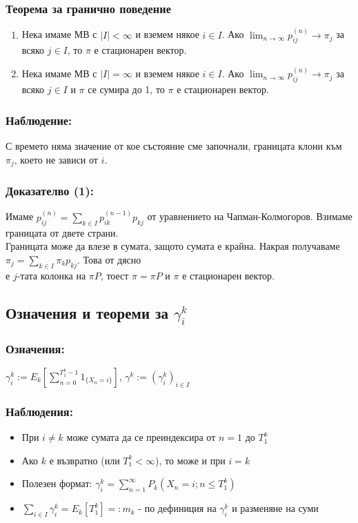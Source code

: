 \documentclass{article}
\begin{document}
\subsubsection*{Теорема за гранично поведение}
\begin{enumerate}
\item Нека имаме МВ с $|I| < \infty$ и вземем някое $i \in I$. Ако $\lim_{n \to \infty} p_{ij}^{(n)} \to \pi_j$ за всяко $j \in I$, то $\pi$ е стационарен вектор.
\item Нека имаме МВ с $|I| = \infty$ и вземем някое $i \in I$. Ако $\lim_{n \to \infty} p_{ij}^{(n)} \to \pi_j$ за всяко $j \in I$ и $\pi$ се сумира до 1, то $\pi$ е стационарен вектор.
\end{enumerate}

\subsubsection*{Наблюдение:}
С времето няма значение от кое състояние сме започнали, границата клони към $\pi_j$, което не зависи от $i$.

\subsubsection*{Доказателво (1):}
Имаме $p_{ij}^{(n)} = \sum_{k \in I} p_{ik}^{(n-1)}p_{kj}$ от уравнението на Чапман-Колмогоров. Взимаме границата от двете страни. \\
Границата може да влезе в сумата, защото сумата е крайна. Накрая получаваме $\pi_j = \sum_{k \in I} \pi_k p_{kj}$. Това от дясно \\
е $j$-тата колонка на $\pi P$, тоест $\pi = \pi P$ и $\pi$ е стационарен вектор.

\subsection{Означения и теореми за $\gamma_i^k$}
\subsubsection*{Означения:}
$\gamma_i^k := E_k\left[\sum_{n=0}^{T_1^k - 1} 1_{\{X_n = i\}}\right]$, $\gamma^k := (\gamma_i^k)_{i \in I}$

\subsubsection*{Наблюдения:}
\begin{itemize}
\item При $i \neq k$ може сумата да се преиндексира от $n=1$ до $T_1^k$
\item Ако $k$ е възвратно (или $T_1^k < \infty$), то може и при $i=k$
\item Полезен формат: $\gamma_i^k = \sum_{n=1}^\infty P_k(X_n = i; n \leq T_1^k)$
\item $\sum_{i \in I} \gamma_i^k = E_k[T_1^k] =: m_k$ - по дефиниция на $\gamma_i^k$ и разменяне на суми
\end{itemize}
\end{document}
